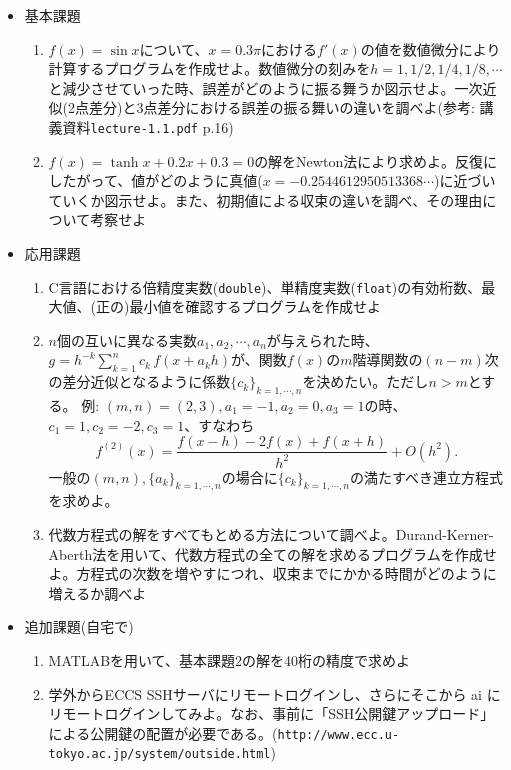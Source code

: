 \documentclass[11pt]{jarticle}
\begin{document}
\begin{itemize}
\item 基本課題
  \begin{enumerate}
  \item $f(x)=\sin x$について、$x=0.3\pi$における$f'(x)$の値を数値微分により計算するプログラムを作成せよ。数値微分の刻みを$h=1,1/2,1/4,1/8,\cdots$と減少させていった時、誤差がどのように振る舞うか図示せよ。一次近似(2点差分)と3点差分における誤差の振る舞いの違いを調べよ(参考: 講義資料{\tt lecture-1.1.pdf} p.16)
  \item $f(x)=\tanh x + 0.2 x + 0.3 = 0$の解をNewton法により求めよ。反復にしたがって、値がどのように真値($x=-0.2544612950513368\cdots$)に近づいていくか図示せよ。また、初期値による収束の違いを調べ、その理由について考察せよ
  \end{enumerate}
  
\item 応用課題
  \begin{enumerate}
  \item C言語における倍精度実数({\tt double})、単精度実数({\tt float})の有効桁数、最大値、(正の)最小値を確認するプログラムを作成せよ
  \item $n$個の互いに異なる実数$a_1,a_2,\cdots,a_n$が与えられた時、$g=h^{-k} \sum_{k=1}^n c_k \, f(x+a_k h)$が、関数$f(x)$の$m$階導関数の$(n-m)$次の差分近似となるように係数$\{ c_k \}_{k=1,\cdots,n}$を決めたい。ただし$n>m$とする。
    例: $(m,n)=(2,3), a_1=-1, a_2=0, a_3=1$の時、$c_1=1, c_2=-2,c_3=1$、すなわち
    \[
    f^{(2)}(x) = \frac{f(x-h)-2f(x)+f(x+h)}{h^2} + O(h^2).
    \]
    一般の$(m,n), \{a_k\}_{k=1,\cdots,n}$の場合に$\{ c_k \}_{k=1,\cdots,n}$の満たすべき連立方程式を求めよ。
  \item 代数方程式の解をすべてもとめる方法について調べよ。Durand-Kerner-Aberth法を用いて、代数方程式の全ての解を求めるプログラムを作成せよ。方程式の次数を増やすにつれ、収束までにかかる時間がどのように増えるか調べよ
  \end{enumerate}  

\item 追加課題(自宅で)
  \begin{enumerate}
  \item MATLABを用いて、基本課題2の解を40桁の精度で求めよ
  \item 学外からECCS SSHサーバにリモートログインし、さらにそこから ai にリモートログインしてみよ。なお、事前に「SSH公開鍵アップロード」による公開鍵の配置が必要である。(\verb+http://www.ecc.u-tokyo.ac.jp/system/outside.html+)
  \end{enumerate}

\end{itemize}
\end{document}
